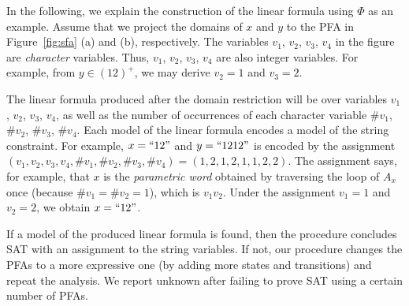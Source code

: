 \documentclass[sigplan,review,anonymous]{acmart}\settopmatter{printfolios=true,printccs=false,printacmref=false}
\begin{document}
In the following, we explain the construction of the linear formula using $\Phi$ as an example. Assume that we project the domains of $x$ and $y$ to the PFA in Figure~\ref{fig:sfa} (a) and (b), respectively. The variables $v_1$, $v_2$, $v_3$, $v_4$ in the figure are \emph{character} variables. Thus, $v_1$, $v_2$, $v_3$, $v_4$ are also integer variables. For example, from  $ y \in (12)^+$, we may derive $v_2=1$ and $v_3=2$. 

The linear formula produced after the domain restriction will be over variables $v_1$, $v_2$, $v_3$, $v_4$, as well as the number of occurrences of each character variable $\#v_1$, $\#v_2$, $\#v_3$, $\#v_4$. Each model of the linear formula encodes a model of the string constraint. For example, $x=``12"$ and $y=``1212"$ is encoded by the assignment $(v_1,v_2,v_3,v_4,\#v_1,\#v_2,\#v_3,\#v_4)= (1,2,1,2,1,1,2,2)$. The assignment says, for example, that $x$ is the \emph{parametric word} obtained by traversing the loop of $A_x$ once (because $\#v_1 = \#v_2 = 1$), which is $v_1v_2$. Under the assignment $v_1=1$ and $v_2=2$, we obtain $x=``12"$.

If a model of the produced linear formula is found, then the procedure concludes SAT with an assignment to the string variables. If not, our procedure changes the PFAs to a more expressive one (by adding more states and transitions) and repeat the analysis.  We report unknown after failing to prove SAT using a certain number of PFAs.



\end{document}
